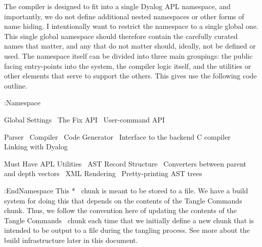 \documentclass{article}%
\begin{document}
The compiler is designed to fit into a single Dyalog APL namespace,
and importantly, we do not define additional nested namespaces or 
other forms of name hiding. 
I intentionally want to restrict the namespace to a single global one.
This single global namespace should therefore contain the carefully 
curated names that matter, and any that do not matter should, ideally,
not be defined or used.
The namespace itself can be divided into three main groupings:
the public facing entry-points into the system,
the compiler logic itself,
and the utilities or other elements that serve to support the others.
This gives use the following code outline.

\nwenddocs{}\endmoddef\nwstartdeflinemarkup\nwenddeflinemarkup
:Namespace 

        \LA{}Global Settings~{\nwtagstyle{}}\RA{}
        \LA{}The Fix API~{\nwtagstyle{}}\RA{}
        \LA{}User-command API~{\nwtagstyle{}}\RA{}

        \LA{}Parser~{\nwtagstyle{}}\RA{}
        \LA{}Compiler~{\nwtagstyle{}}\RA{}
        \LA{}Code Generator~{\nwtagstyle{}}\RA{}
        \LA{}Interface to the backend C compiler~{\nwtagstyle{}}\RA{}
        \LA{}Linking with Dyalog~{\nwtagstyle{}}\RA{}

        \LA{}Must Have APL Utilities~{\nwtagstyle{}}\RA{}
        \LA{}AST Record Structure~{\nwtagstyle{}}\RA{}
        \LA{}Converters between parent and depth vectors~{\nwtagstyle{}}\RA{}
        \LA{}XML Rendering~{\nwtagstyle{}}\RA{}
        \LA{}Pretty-printing AST trees~{\nwtagstyle{}}\RA{}

:EndNamespace
\eatline
\nwnotused{*}\nwendcode{}\nwdocspar
This {\Tt{}\LA{}*~{\nwtagstyle{}}\RA{}\nwendquote} chunk is meant to be stored to a file. 
We have a build system for doing this that depends
on the contents of the {\Tt{}\LA{}Tangle Commands~{\nwtagstyle{}}\RA{}\nwendquote} chunk. 
Thus, we follow the convention here of updating the contents of 
the {\Tt{}\LA{}Tangle Commands~{\nwtagstyle{}}\RA{}\nwendquote} chunk each time that we initially define
a new chunk that is intended to be output to a file during the 
tangling process. 
See more about the build infrastructure later in this document.
\end{document}
